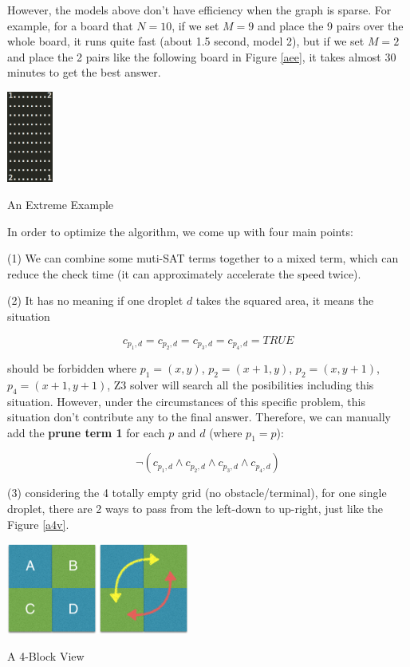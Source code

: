 \documentclass[twocolumn]{article}
\begin{document}
However, the models above don't have efficiency when the graph is sparse. For example, for a board that $N=10$, if we set $M=9$ and place the 9 pairs over the whole board, it runs quite fast (about 1.5 second, model 2), but if we set $M=2$ and place the 2 pairs like the following board in Figure \ref{aee}, it takes almost 30 minutes to get the best answer.

\begin{center}
\makeatletter
\def\@captype{figure}
\makeatother
\includegraphics [height=3cm]{example}
\caption{An Extreme Example}
\label{aee}
\end{center}

In order to optimize the algorithm, we come up with four main points:

(1) We can combine some muti-SAT terms together to a mixed term, which can reduce the check time (it can approximately accelerate the speed twice).

(2) It has no meaning if one droplet $d$ takes the squared area, it means the situation

\[
c_{p_1, d} = c_{p_2, d} = c_{p_3, d} = c_{p_4, d} = TRUE
\]

should be forbidden where $p_1 = (x, y)$, $p_2 = (x + 1, y)$, $p_2 = (x, y + 1)$, $p_4 = (x + 1, y + 1)$, Z3 solver will search all the posibilities including this situation. However, under the circumstances of this specific problem, this situation don't contribute any to the final answer. Therefore, we can manually add the \textbf{prune term 1} for each $p$ and $d$ (where $p_1 = p$):

\[
\neg(c_{p_1, d} \wedge c_{p_2, d} \wedge c_{p_3, d} \wedge c_{p_4, d})
\]

(3) considering the 4 totally empty grid (no obstacle/terminal), for one single droplet, there are 2 ways to pass from the left-down to up-right, just like the Figure \ref{a4v}.

\begin{center}
\makeatletter
\def\@captype{figure}
\makeatother
\includegraphics [height=3cm]{example2}
\caption{A 4-Block View}
\label{a4v}
\end{center}
\end{document}
